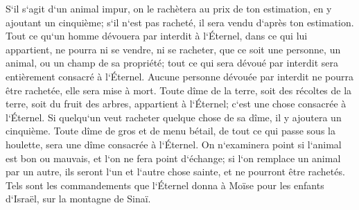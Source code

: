 \verse S`il s`agit d`un animal impur, on le rachètera au prix de ton estimation, en y ajoutant un cinquième; s`il n`est pas racheté, il sera vendu d`après ton estimation. 
\verse Tout ce qu`un homme dévouera par interdit à l`Éternel, dans ce qui lui appartient, ne pourra ni se vendre, ni se racheter, que ce soit une personne, un animal, ou un champ de sa propriété; tout ce qui sera dévoué par interdit sera entièrement consacré à l`Éternel. 
\verse Aucune personne dévouée par interdit ne pourra être rachetée, elle sera mise à mort. 
\verse Toute dîme de la terre, soit des récoltes de la terre, soit du fruit des arbres, appartient à l`Éternel; c`est une chose consacrée à l`Éternel. 
\verse Si quelqu`un veut racheter quelque chose de sa dîme, il y ajoutera un cinquième. 
\verse Toute dîme de gros et de menu bétail, de tout ce qui passe sous la houlette, sera une dîme consacrée à l`Éternel. 
\verse On n`examinera point si l`animal est bon ou mauvais, et l`on ne fera point d`échange; si l`on remplace un animal par un autre, ils seront l`un et l`autre chose sainte, et ne pourront être rachetés. 
\verse Tels sont les commandements que l`Éternel donna à Moïse pour les enfants d`Israël, sur la montagne de Sinaï. 
